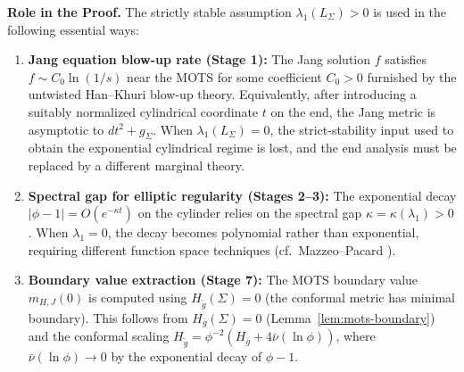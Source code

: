 \textbf{Role in the Proof.}
The strictly stable assumption $\lambda_1(L_\Sigma) > 0$ is used in the following essential ways:
\begin{enumerate}[label=(\arabic*)]
    \item \textbf{Jang equation blow-up rate (Stage 1):} The Jang solution $f$ satisfies $f \sim C_0 \ln(1/s)$ near the MOTS for some coefficient $C_0>0$ furnished by the untwisted Han--Khuri blow-up theory. Equivalently, after introducing a suitably normalized cylindrical coordinate $t$ on the end, the Jang metric is asymptotic to $dt^2 + g_\Sigma$. When $\lambda_1(L_\Sigma)=0$, the strict-stability input used to obtain the exponential cylindrical regime is lost, and the end analysis must be replaced by a different marginal theory.
    
    \item \textbf{Spectral gap for elliptic regularity (Stages 2--3):} The exponential decay $|\phi - 1| = O(e^{-\kappa t})$ on the cylinder relies on the spectral gap $\kappa = \kappa(\lambda_1) > 0$. When $\lambda_1 = 0$, the decay becomes polynomial rather than exponential, requiring different function space techniques (cf.\ Mazzeo--Pacard \cite{mazzeo-pacard-constant}).
    
    \item \textbf{Boundary value extraction (Stage 7):} The MOTS boundary value $m_{H,J}(0)$ is computed using $H_{\tilde{g}}(\Sigma) = 0$ (the conformal metric has minimal boundary). This follows from $H_{\bar{g}}(\Sigma) = 0$ (Lemma~\ref{lem:mots-boundary}) and the conformal scaling $H_{\tilde{g}} = \phi^{-2}(H_{\bar{g}} + 4\bar{\nu}(\ln\phi))$, where $\bar{\nu}(\ln\phi) \to 0$ by the exponential decay of $\phi - 1$.
\end{enumerate}

